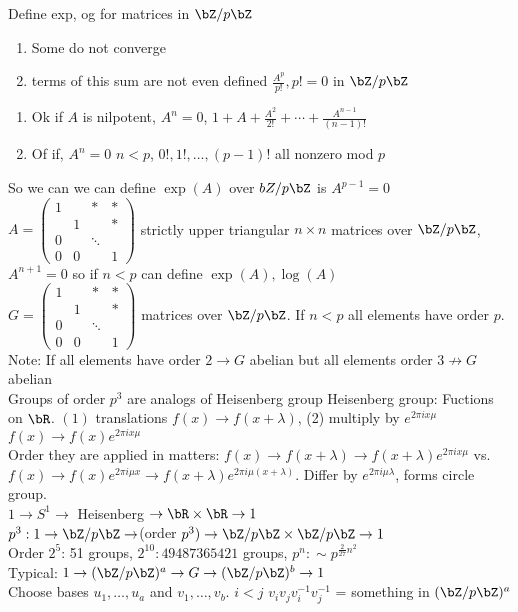 \noindent
Define exp, og for matrices in $\bZ/p\bZ$ 
\begin{enumerate}
    \item Some do not converge 
    \item terms of this sum are not even defined $\frac{A^p}{p!}, p! = 0$ in $\bZ/p\bZ$ 
\end{enumerate}
\begin{enumerate}
    \item Ok if $A$ is nilpotent, $A^n=0$, $1 + A + \frac{A^2}{2!} + \cdots + \frac{A^{n-1}}{(n-1)!}$ 
    \item Of if, $A^n=0$ $n < p$, $0!, 1!, \ldots, (p-1)!$ all nonzero mod $p$ 
\end{enumerate}
So we can we can define $\exp(A)$ over $bZ/p\bZ$ is $A^{p-1}=0$ \\
$A = \begin{pmatrix} 1 & & * & * \\ & 1 & & * \\ 0 & & \ddots & \\ 0 & 0 & & 1 \end{pmatrix}$ strictly upper triangular $n \times n$ matrices over $\bZ/p\bZ$, $A^{n+1}=0$ so if $n < p$ can define $\exp(A), \log(A)$ \\
$G = \begin{pmatrix} 1 & & * & * \\ & 1 & & * \\ 0 & & \ddots & \\ 0 & 0 & & 1 \end{pmatrix}$ matrices over $\bZ/p\bZ$. If $n<p$ all elements have order $p$. \\
Note: If all elements have order $2 \to G$ abelian but all elements order $3 \not\to G$ abelian \\ 
Groups of order $p^3$ are analogs of Heisenberg group
Heisenberg group: Fuctions on $\bR$. $(1)$ translations $f(x) \to f(x + \lambda)$, (2) multiply by $e^{2\pi i x \mu }$ $f(x) \to f(x)e^{2 \pi i x \mu}$ \\
Order they are applied in matters: $f(x) \to f(x + \lambda) \to f(x+\lambda)e^{2 \pi i x \mu}$ vs. $f(x) \to f(x)e^{2\pi i \mu x}\to f(x+ \lambda)e^{2 \pi i \mu(x + \lambda)}$. Differ by $e^{2 \pi i \mu \lambda}$, forms circle group. \\
$1 \to S^1 \to$ Heisenberg $\to \bR \times \bR \to 1$ \\
$p^3: 1 \to \bZ/p\bZ \to $(order $p^3) \to \bZ/p\bZ \times \bZ/p\bZ \to 1$ \\
Order $2^5$: 51 groups, $2^{10}: 49487365421$ groups, $p^n : \sim p^{\frac{2}{27}n^2}$ \\
Typical: $1 \to (\bZ/p\bZ)^a \to G \to (\bZ/p\bZ)^b \to 1$ \\
Choose bases $u_1, \ldots, u_a$ and $v_1, \ldots, v_b$. $i < j$ $v_iv_jv_i^{-1}v_j^{-1}$ = something in $(\bZ/p\bZ)^a$ \\

